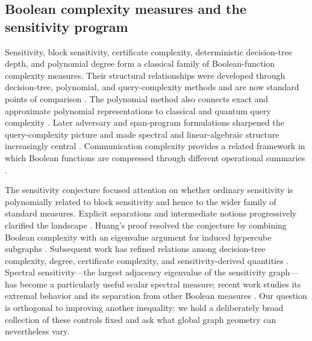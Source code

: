 \documentclass[twoside,12pt,letterpaper]{article}
\theoremstyle{definition}
\begin{document}
\subsection{Boolean complexity measures and the sensitivity program}
Sensitivity, block sensitivity, certificate complexity, deterministic decision-tree depth, and polynomial degree form a classical family of Boolean-function complexity measures. Their structural relationships were developed through decision-tree, polynomial, and query-complexity methods and are now standard points of comparison \parencite{nisan1991,nisan1994,buhrman2002,wegener1987,jukna2012,odonnell2014}. The polynomial method also connects exact and approximate polynomial representations to classical and quantum query complexity \parencite{beals1998,dewolf2002,midrijanis2004,aaronson2003,bernstein1997}. Later adversary and span-program formulations sharpened the query-complexity picture and made spectral and linear-algebraic structure increasingly central \parencite{hoyer2007,reichardt2011,reichardt2012,lee2011,ambainis2017,aaronson2021}. Communication complexity provides a related framework in which Boolean functions are compressed through different operational summaries \parencite{kushilevitz1997}.

The sensitivity conjecture focused attention on whether ordinary sensitivity is polynomially related to block sensitivity and hence to the wider family of standard measures. Explicit separations and intermediate notions progressively clarified the landscape \parencite{rubinstein1995,kenyon2004,virza2011,hatami2011,he2019}. Huang's proof resolved the conjecture by combining Boolean complexity with an eigenvalue argument for induced hypercube subgraphs \parencite{huang2019,chung1988}. Subsequent work has refined relations among decision-tree complexity, degree, certificate complexity, and sensitivity-derived quantities \parencite{chugh2023,nalli2026}. Spectral sensitivity---the largest adjacency eigenvalue of the sensitivity graph---has become a particularly useful scalar spectral measure; recent work studies its extremal behavior and its separation from other Boolean measures \parencite{aaronson2021,prusis2025,meiburg2026}. Our question is orthogonal to improving another inequality: we hold a deliberately broad collection of these controls fixed and ask what global graph geometry can nevertheless vary.
\end{document}
